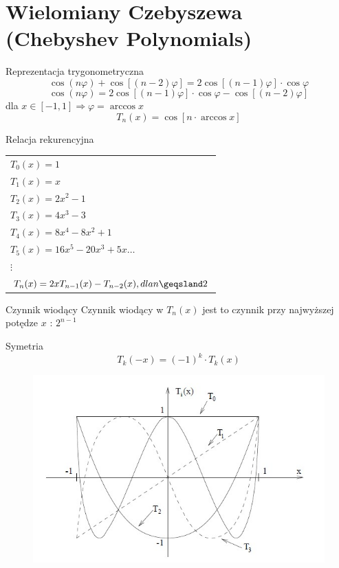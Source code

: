 \section{Wielomiany Czebyszewa (Chebyshev Polynomials)}
\begin{frame}{Reprezentacja trygonometryczna}
	$$\cos(n\varphi)+\cos[(n-2)\varphi] = 2\cos[(n-1)\varphi] \cdot \cos \varphi$$
    $$\cos(n\varphi) = 2\cos[(n-1)\varphi] \cdot \cos \varphi - \cos[(n-2)\varphi]$$
    dla $x \in [-1,1]\Rightarrow \varphi=\arccos x$
    $$T_n(x) = \cos[n \cdot \arccos x]$$
\end{frame}
\begin{frame}{Relacja rekurencyjna}
	\begin{tabular}{l}
		$T_0(x) = 1$ \\
        $T_1(x) = x$ \\
        $T_2(x) = 2x^2-1$ \\
        $T_3(x) = 4x^3-3$ \\
        $T_4(x) = 8x^4-8x^2+1$ \\
        $T_5(x) = 16x^5-20x^3+5x\ldots$ \\
        $\vdots$ \\
        $T_n(x) = 2xT_{n-1}(x) - T_{n-2}(x), dla n\geqsland2$
	\end{tabular}
    
    \begin{block}{Czynnik wiodący}
    	Czynnik wiodący w $T_n(x)$ jest to czynnik przy najwyższej potędze $x$ : $2^{n-1}$
    \end{block}
\end{frame}
\begin{frame}{Symetria}
	$$T_k(-x)=(-1)^k \cdot T_k(x)$$
    \begin{figure}
		\includegraphics[height=0.75\textheight]{img/5/symetria.jpg}
	\end{figure}
\end{frame}
